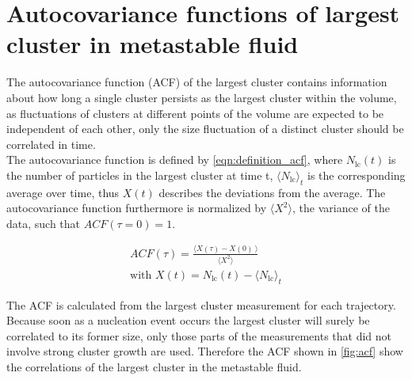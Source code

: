 \section{Autocovariance functions of largest cluster in metastable fluid}
\label{sec:acf}
The autocovariance function (ACF) of the largest cluster contains information about how long a single cluster persists as the largest cluster within the volume, as fluctuations of clusters at different points of the volume are expected to be independent of each other, only the size fluctuation of a distinct cluster should be correlated in time.\\

The autocovariance function is defined by \autoref{eqn:definition_acf}, where $N_{\text{lc}}(t)$ is the number of particles in the largest cluster at time t, $\langle N_{\text{lc}} \rangle_t$ is the corresponding average over time, thus $X(t)$ describes the deviations from the average. The autocovariance function furthermore is normalized by ${ \langle X^2  \rangle }$, the variance of the data, such that $ACF(\tau=0) = 1 $.

\begin{align}
\label{eqn:definition_acf} 
ACF(\tau)=\frac{ \langle  X(\tau)-X(0) \! \: \rangle } { \langle X^2  \rangle }\\  
\text{with } X(t)=N_{\text{lc}}(t)- \langle N_{\text{lc}} \rangle_t 
\end{align}

The ACF is calculated from the largest cluster measurement for each trajectory. Because soon as a nucleation event occurs the largest cluster will surely be correlated to its former size, only those parts of the measurements that did not involve strong cluster growth are used. Therefore the ACF shown in \autoref{fig:acf} show the correlations of the largest cluster in the metastable fluid.\\

